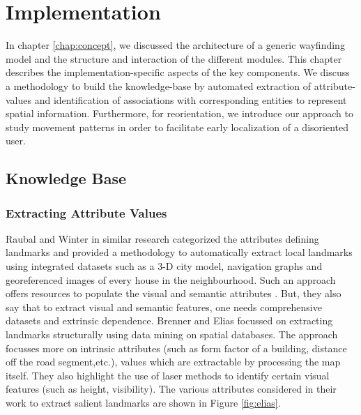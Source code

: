 \documentclass{iitkthesis}
\begin{document}
 \chapter{Implementation}
 \label{chap:implement}
In chapter \ref{chap:concept}, we discussed the 
architecture of a generic wayfinding model and the structure and interaction 
of the different modules. This chapter describes the implementation-specific 
aspects of the key components. We discuss a methodology to build the 
knowledge-base by automated extraction of attribute-values and 
identification of associations with corresponding entities to 
represent spatial information. Furthermore, for reorientation, 
we introduce our approach to study movement patterns in order to 
facilitate early localization of a disoriented user.

 \section{Knowledge Base}
  \label{sec:kbase}
\subsection{Extracting Attribute Values}
Raubal and Winter \cite{raubal} in similar research categorized
the attributes defining landmarks and provided a methodology to 
automatically extract local landmarks using integrated datasets such as a
3-D city model, navigation graphs and georeferenced images of every house 
in the neighbourhood. Such an approach offers resources to populate the 
visual and semantic attributes . But, they also say that to extract 
visual and semantic features, one needs comprehensive datasets and 
extrinsic dependence.  Brenner and Elias \cite{brenner} focussed on 
extracting landmarks structurally using data mining on spatial 
databases. The approach focusses more on intrinsic attributes (such as 
form factor of a building, distance off the road segment,etc.), values 
which are extractable by processing the map itself. They also 
highlight the use of laser methods to identify certain visual features 
(such as height, visibility).  The various attributes considered in their 
work to extract salient landmarks are shown in Figure \ref{fig:elias}.
\end{document}
